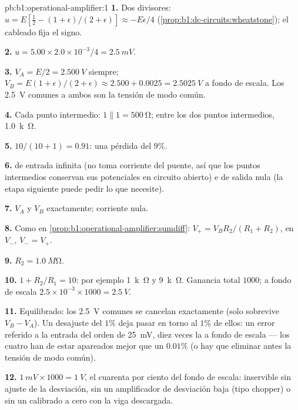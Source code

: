 \begin{solution}{pb:b1:operational-amplifier:1}
\textbf{1.} Dos divisores: $u = E[\tfrac12 - (1 + \epsilon)/(2 + \epsilon)]
\approx -E\epsilon/4$ (\cref{prop:b1:dc-circuits:wheatstone}); el cableado
fija el signo.

\textbf{2.} $u = 5.00 \times 2.0\times10^{-3}/4 = \qty{2.5}{mV}$.

\textbf{3.} $V_A = E/2 = \qty{2.500}{V}$ siempre; $V_B = E(1 + \epsilon)/(2 +
\epsilon) \approx 2.500 + 0.0025 = \qty{2.5025}{V}$ a fondo de escala. Los
\qty{2.5}{V} comunes a ambos son la tensión de modo común.

\textbf{4.} Cada punto intermedio: $1 \parallel 1 = \qty{500}{\ohm}$; entre
los dos puntos intermedios, \qty{1.0}{k\ohm}.

\textbf{5.} $10/(10 + 1) = 0.91$: una pérdida del $9\%$.

\textbf{6.}  de entrada infinita (no toma corriente del puente,
así que los puntos intermedios conservan sus potenciales en circuito
abierto) e  de salida nula (la etapa siguiente puede pedir lo que necesite).

\textbf{7.} $V_A$ y $V_B$ exactamente; corriente nula.

\textbf{8.} Como en \cref{prop:b1:operational-amplifier:sumdiff}: $V_+ =
V_BR_2/(R_1 + R_2)$,  en $V_-$, $V_- = V_+$.

\textbf{9.} $R_2 = \qty{1.0}{M\ohm}$.

\textbf{10.} $1 + R_2/R_1 = 10$: por ejemplo \qty{1}{k\ohm} y \qty{9}{k\ohm}.
Ganancia total $1000$; a fondo de escala $2.5 \times 10^{-3} \times 1000 = \qty{2.5}{V}$.

\textbf{11.} Equilibrado: los \qty{2.5}{V} comunes se cancelan exactamente
(solo sobrevive $V_B - V_A$). Un desajuste del $1\%$ deja pasar en torno
al $1\%$ de ellos: un error referido a la entrada del orden de
\qty{25}{mV}, diez veces la  a fondo de escala --- los cuatro
 han de estar apareados mejor que un $0.01\%$ (o hay que
eliminar antes la tensión de modo común).

\textbf{12.} $1\ \unit{mV} \times 1000 = \qty{1}{V}$, el cuarenta por
ciento del fondo de escala: inservible sin ajuste de la desviación, sin un
amplificador de desviación baja (tipo chopper) o sin un calibrado a
cero con la viga descargada.


\end{solution}
